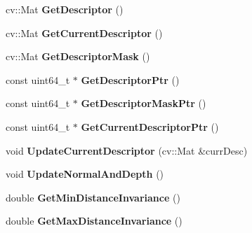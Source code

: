 \begin{DoxyCompactItemize}
\item 
cv\+::\+Mat {\bfseries Get\+Descriptor} ()\hypertarget{classMultiColSLAM_1_1cMapPoint_ab8ce1dc8d9e409909a79e31adeedf227}{}\label{classMultiColSLAM_1_1cMapPoint_ab8ce1dc8d9e409909a79e31adeedf227}

\item 
cv\+::\+Mat {\bfseries Get\+Current\+Descriptor} ()\hypertarget{classMultiColSLAM_1_1cMapPoint_a84cffa1f67ffed3decfee49165aced24}{}\label{classMultiColSLAM_1_1cMapPoint_a84cffa1f67ffed3decfee49165aced24}

\item 
cv\+::\+Mat {\bfseries Get\+Descriptor\+Mask} ()\hypertarget{classMultiColSLAM_1_1cMapPoint_ad9b2d06bf8d53337a286b876beceaae7}{}\label{classMultiColSLAM_1_1cMapPoint_ad9b2d06bf8d53337a286b876beceaae7}

\item 
const uint64\+\_\+t $\ast$ {\bfseries Get\+Descriptor\+Ptr} ()\hypertarget{classMultiColSLAM_1_1cMapPoint_a8bfc992a5d2ca65817899ee27630670f}{}\label{classMultiColSLAM_1_1cMapPoint_a8bfc992a5d2ca65817899ee27630670f}

\item 
const uint64\+\_\+t $\ast$ {\bfseries Get\+Descriptor\+Mask\+Ptr} ()\hypertarget{classMultiColSLAM_1_1cMapPoint_a359a4f713ac4ba9fd0ace237b31e77c8}{}\label{classMultiColSLAM_1_1cMapPoint_a359a4f713ac4ba9fd0ace237b31e77c8}

\item 
const uint64\+\_\+t $\ast$ {\bfseries Get\+Current\+Descriptor\+Ptr} ()\hypertarget{classMultiColSLAM_1_1cMapPoint_a3ffced99451fbefcd29b296933130f71}{}\label{classMultiColSLAM_1_1cMapPoint_a3ffced99451fbefcd29b296933130f71}

\item 
void {\bfseries Update\+Current\+Descriptor} (cv\+::\+Mat \&curr\+Desc)\hypertarget{classMultiColSLAM_1_1cMapPoint_a4b4e7bdd297059cd3d2f5026994f6c38}{}\label{classMultiColSLAM_1_1cMapPoint_a4b4e7bdd297059cd3d2f5026994f6c38}

\item 
void {\bfseries Update\+Normal\+And\+Depth} ()\hypertarget{classMultiColSLAM_1_1cMapPoint_a3ac8cd1186d82d1c293403cebffdb60a}{}\label{classMultiColSLAM_1_1cMapPoint_a3ac8cd1186d82d1c293403cebffdb60a}

\item 
double {\bfseries Get\+Min\+Distance\+Invariance} ()\hypertarget{classMultiColSLAM_1_1cMapPoint_a3c9c74cdd1ab20d9f53138bfb93910bf}{}\label{classMultiColSLAM_1_1cMapPoint_a3c9c74cdd1ab20d9f53138bfb93910bf}

\item 
double {\bfseries Get\+Max\+Distance\+Invariance} ()\hypertarget{classMultiColSLAM_1_1cMapPoint_ab7c67b2ef281e69ff469385b37eb20cd}{}\label{classMultiColSLAM_1_1cMapPoint_ab7c67b2ef281e69ff469385b37eb20cd}

\end{DoxyCompactItemize}
